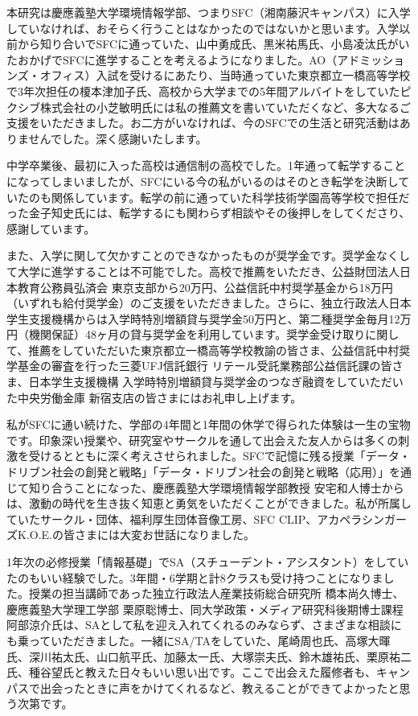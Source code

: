 本研究は慶應義塾大学環境情報学部、つまりSFC（湘南藤沢キャンパス）に入学していなければ、おそらく行うことはなかったのではないかと思います。入学以前から知り合いでSFCに通っていた、山中勇成氏、黒米祐馬氏、小島凌汰氏がいたおかげでSFCに進学することを考えるようになりました。AO（アドミッションズ・オフィス）入試を受けるにあたり、当時通っていた東京都立一橋高等学校で3年次担任の榎本津加子氏、高校から大学までの5年間アルバイトをしていたピクシブ株式会社の小芝敏明氏には私の推薦文を書いていただくなど、多大なるご支援をいただきました。お二方がいなければ、今のSFCでの生活と研究活動はありませんでした。深く感謝いたします。

中学卒業後、最初に入った高校は通信制の高校でした。1年通って転学することになってしまいましたが、SFCにいる今の私がいるのはそのとき転学を決断していたのも関係しています。転学の前に通っていた科学技術学園高等学校で担任だった金子知史氏には、転学するにも関わらず相談やその後押しをしてくださり、感謝しています。

また、入学に関して欠かすことのできなかったものが奨学金です。奨学金なくして大学に進学することは不可能でした。高校で推薦をいただき、公益財団法人日本教育公務員弘済会 東京支部から20万円、公益信託中村奨学基金から18万円（いずれも給付奨学金）のご支援をいただきました。さらに、独立行政法人日本学生支援機構からは入学時特別増額貸与奨学金50万円と、第二種奨学金毎月12万円（機関保証）48ヶ月の貸与奨学金を利用しています。奨学金受け取りに関して、推薦をしていただいた東京都立一橋高等学校教諭の皆さま、公益信託中村奨学基金の審査を行った三菱UFJ信託銀行 リテール受託業務部公益信託課の皆さま、日本学生支援機構 入学時特別増額貸与奨学金のつなぎ融資をしていただいた中央労働金庫 新宿支店の皆さまにはお礼申し上げます。

私がSFCに通い続けた、学部の4年間と1年間の休学で得られた体験は一生の宝物です。印象深い授業や、研究室やサークルを通して出会えた友人からは多くの刺激を受けるとともに深く考えさせられました。SFCで記憶に残る授業「データ・ドリブン社会の創発と戦略」「データ・ドリブン社会の創発と戦略（応用）」を通じて知り合うことになった、慶應義塾大学環境情報学部教授 安宅和人博士からは、激動の時代を生き抜く知恵と勇気をいただくことができました。私が所属していたサークル・団体、福利厚生団体音像工房、SFC CLIP、アカペラシンガーズK.O.E.の皆さまには大変お世話になりました。

1年次の必修授業「情報基礎」でSA（スチューデント・アシスタント）をしていたのもいい経験でした。3年間・6学期と計8クラスも受け持つことになりました。授業の担当講師であった独立行政法人産業技術総合研究所 橋本尚久博士、慶應義塾大学理工学部 栗原聡博士、同大学政策・メディア研究科後期博士課程 阿部涼介氏は、SAとして私を迎え入れてくれるのみならず、さまざまな相談にも乗っていただきました。一緒にSA/TAをしていた、尾崎周也氏、高塚大暉氏、深川祐太氏、山口航平氏、加藤太一氏、大塚崇夫氏、鈴木雄祐氏、栗原祐二氏、種谷望氏と教えた日々もいい思い出です。ここで出会えた履修者も、キャンパスで出会ったときに声をかけてくれるなど、教えることができてよかったと思う次第です。

